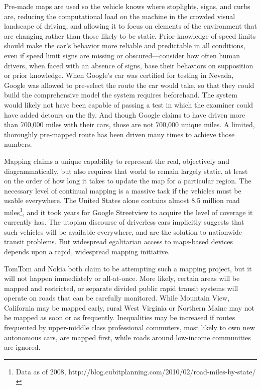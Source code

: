 Pre-made maps are used so the vehicle knows where stoplights, signs,
and curbs are, reducing the computational load on the machine in the
crowded visual landscape of driving, and allowing it to focus on
elements of the environment that are changing rather than those likely
to be static.\cite{???} Prior knowledge of speed limits should make the car's
behavior more reliable and predictable in all conditions, even if
speed limit signs are missing or obscured---consider how often human
drivers, when faced with an absence of signs, base their behaviors on
supposition or prior knowledge. When Google's car was certified for
testing in Nevada, Google was allowed to pre-select the route the car
would take, so that they could build the comprehensive model the
system requires beforehand.\cite{???} The system would likely not have been
capable of passing a test in which the examiner could have added
detours on the fly. And though Google claims to have driven more than
700,000 miles with their cars, those are not 700,000 unique miles. A
limited, thoroughly pre-mapped route has been driven many times to
achieve those numbers.\cite{???}

Mapping claims a unique capability to
represent the real, objectively
and diagrammatically, but also requires that world to remain largely
static, at least on the order of how long it takes to update the map
for a particular region. The necessary level of continual mapping is a massive task if the
vehicles must be usable everywhere. The United States alone contains almost
8.5 million road miles\footnote{Data as of 2008,
  http://blog.cubitplanning.com/2010/02/road-miles-by-state/\cite{???}},
and it took years for Google Streetview to acquire the level of
coverage it currently has. The utopian discourse of driverless cars
implicitly suggests that such vehicles will be available everywhere,
and are the solution to nationwide transit problems. But widespread
egalitarian access to maps-based devices depends upon a rapid,
widespread mapping initiative.

TomTom\cite{???} and Nokia\cite{???} both claim to be attempting such a mapping project,
but it will not happen immediately or all-at-once. More likely,
certain areas will be 
mapped and restricted, or separate divided public rapid transit
systems will operate on roads that can be carefully
monitored.\cite{???} While
Mountain View, California may be mapped early, rural West Virginia or
Northern Maine may not be mapped as soon or as frequently.
Inequalities may be increased if routes frequented by upper-middle
class professional commuters, most likely to own new autonomous cars,
are mapped first, while roads around low-income communities are
ignored. 

